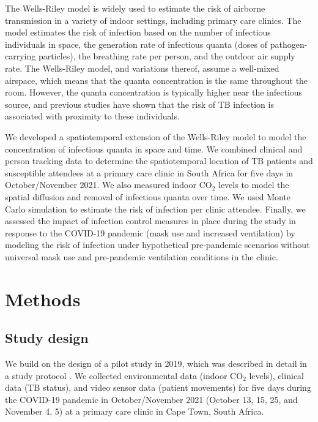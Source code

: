 \documentclass[fleqn,11pt]{wlscirep}
\begin{document}
The Wells-Riley model\cite{Riley1978AJE} is widely used to estimate the risk of airborne transmission in a variety of indoor settings\cite{Andrews2014JID,Taylor2016IJTLD,Hella2017JInfect,Zemouri2020JDR}, including primary care clinics\cite{Zurcher2022JID,McCreesh2021BMJGlobalHealth}. The model estimates the risk of infection based on the number of infectious individuals in space, the generation rate of infectious quanta (doses of pathogen-carrying particles), the breathing rate per person, and the outdoor air supply rate. The Wells-Riley model, and variations thereof\cite{Rudnick2003IndoorAir}, assume a well-mixed airspace, which means that the quanta concentration is the same throughout the room. However, the quanta concentration is typically higher near the infectious source\cite{Wang2021Science,Vuorinen2020SafSci,Chen2020BuildEnv}, and previous studies have shown that the risk of TB infection is associated with proximity to these individuals\cite{Ko2004RiskAnal,Kenyon1996NEJM}.

We developed a spatiotemporal extension of the Wells-Riley model to model the concentration of infectious quanta in space and time. We combined clinical and person tracking data to determine the spatiotemporal location of TB patients and susceptible attendees at a primary care clinic in South Africa for five days in October/November 2021. We also measured indoor CO$_2$ levels to model the spatial diffusion and removal of infectious quanta over time. We used Monte Carlo simulation to estimate the risk of infection per clinic attendee. Finally, we assessed the impact of infection control measures in place during the study in response to the COVID-19 pandemic (mask use and increased ventilation) by modeling the risk of infection under hypothetical pre-pandemic scenarios without universal mask use and pre-pandemic ventilation conditions in the clinic.

\newpage

\section{Methods}

\subsection{Study design}

We build on the design of a pilot study in 2019\cite{Zurcher2022JID}, which was described in detail in a study protocol \cite{Zurcher2020BMJ}. We collected environmental data (indoor CO$_2$ levels), clinical data (TB status), and video sensor data (patient movements) for five days during the COVID-19 pandemic in October/November 2021 (October 13, 15, 25, and November 4, 5) at a primary care clinic in Cape Town, South Africa. 
\end{document}
